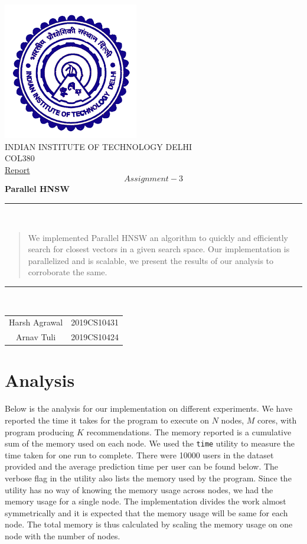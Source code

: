 \documentclass[hidelinks,12pt]{article}
\begin{document}
\begin{titlepage}
  \centering
  \includegraphics[scale=0.5]{iitdlogo.png}\\[1.0cm]
  \Large INDIAN INSTITUTE OF TECHNOLOGY DELHI\\[1.0 cm]
  \LARGE COL380\\[0.1cm]
  \Large \underline{Report}\\
  \large \[Assignment-3\]
  \LARGE \textbf{Parallel HNSW}


  \rule{\textwidth}{0.2 mm} \\[0.1cm]
  \begin{abstract}
    We implemented Parallel HNSW an algorithm to quickly and efficiently search for closest vectors
    in a given search space. Our implementation is parallelized and is scalable, we present the results of
    our analysis to corroborate the same.
    \\[0.1cm]
  \end{abstract}
  \rule{\textwidth}{0.2 mm} \\[0.1cm]
  \begin{flushright}

    \begin{tabular}{c|c}
      \small {Harsh Agrawal} & \small {2019CS10431} \\
      \small {Arnav Tuli}    & \small {2019CS10424} \\
    \end{tabular}
  \end{flushright}
\end{titlepage}

\section{Analysis}
Below is the analysis for our implementation on different experiments.
We have reported the time it takes for the program to execute on $N$ nodes, $M$ cores,
with program producing $K$ recommendations. The memory reported is a cumulative sum of the memory used on each node.
We used the \verb|time| utility to measure the time taken for one run to complete. There were 10000 users in the dataset provided and the average prediction time per user can be found below.
The verbose flag in the utility also lists the memory used by the program. Since the utility has no way of knowing the memory usage
across nodes, we had the memory usage for a single node. The implementation divides the work almost symmetrically and
it is expected that the memory usage will be same for each node. The total memory is thus calculated by scaling the memory usage
on one node with the number of nodes.
\end{document}
